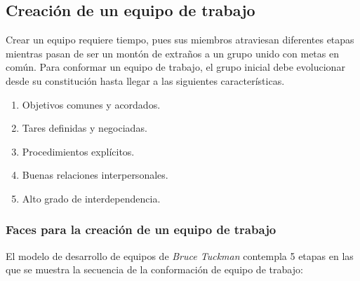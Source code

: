 \subsection{Creación de un equipo de trabajo}
Crear un equipo requiere tiempo, pues sus miembros atraviesan diferentes
etapas mientras pasan de ser un montón de extraños a un grupo unido
con metas en común.
Para conformar un equipo de trabajo, el grupo inicial debe
evolucionar desde su constitución hasta llegar a las siguientes
características.

\begin{enumerate}
    \item Objetivos comunes y acordados.
    \item Tares definidas y negociadas.
    \item Procedimientos explícitos.
    \item Buenas relaciones interpersonales.
    \item Alto grado de interdependencia.
\end{enumerate}


\subsubsection{Faces para la creación de un equipo de trabajo}
El modelo de desarrollo de equipos de \textit{Bruce Tuckman} contempla 5
etapas en las que se muestra la secuencia de la conformación de equipo de
trabajo:

